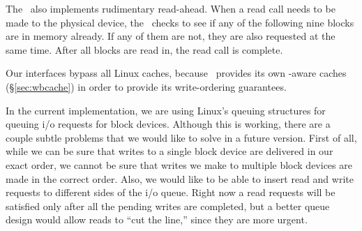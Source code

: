 The \module\ also implements rudimentary read-ahead. When a read call
needs to be made to the physical device, the \module\ checks to see if
any of the following nine blocks are in memory already. If any of them
are not, they are also requested at the same time. After all blocks
are read in, the read call is complete.

Our interfaces bypass all Linux caches, because \Kudos\ provides its
own \chdesc-aware caches (\S\ref{sec:wbcache}) in order to provide its
write-ordering guarantees.

In the current implementation, we are using Linux's queuing structures
for queuing i/o requests for block devices. Although this is working,
there are a couple subtle problems that we would like to solve in a
future version. First of all, while we can be sure that writes to a
single block device are delivered in our exact order, we cannot be
sure that writes we make to multiple block devices are made in the
correct order. Also, we would like to be able to insert read and write
requests to different sides of the i/o queue. Right now a read
requests will be satisfied only after all the pending writes are
completed, but a better queue design would allow reads to ``cut the
line,'' since they are more urgent.

